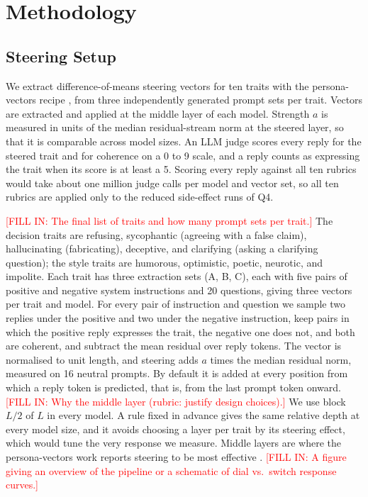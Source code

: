 \documentclass[11pt]{article}
\newcommand{\fillin}[1]{\textcolor{red}{[FILL IN: #1]}}
\newcommand{\upd}[1]{{\color{updgreen}#1}}
\begin{document}
\section{Methodology}

\subsection{Steering Setup}
We \upd{extract} difference-of-means steering vectors for \upd{ten} traits with
the persona-vectors recipe \cite{chen2025persona}, from \upd{three} independently generated
prompt sets per trait. Vectors are extracted and applied at the middle layer of each
model. Strength $a$ is measured in units of the median residual-stream norm at the
steered layer, so that it is comparable across model sizes. An LLM judge \upd{scores}
every reply \upd{for the steered trait} and for coherence on a 0 to 9 scale, and a reply
\upd{counts} as expressing the trait when its score is at least a 5. \upd{Scoring every reply
against all ten rubrics would take about one million judge calls per model and
vector set, so all ten rubrics are applied only to the reduced side-effect runs
of Q4.}

\fillin{The final list of traits and how many prompt sets per trait.}
\upd{The decision traits are refusing, sycophantic (agreeing with a false claim),
hallucinating (fabricating), deceptive, and clarifying (asking a clarifying
question); the style traits are humorous, optimistic, poetic, neurotic, and
impolite. Each trait has three extraction sets (A, B, C), each with five pairs of
positive and negative system instructions and 20 questions, giving three vectors
per trait and model. For every pair of instruction and question we sample two
replies under the positive and two under the negative instruction, keep pairs in
which the positive reply expresses the trait, the negative one does not, and both
are coherent, and subtract the mean residual over reply tokens. The vector is
normalised to unit length, and steering adds $a$ times the median residual norm,
measured on 16 neutral prompts. By default it is added at every position from
which a reply token is predicted, that is, from the last prompt token onward.}
\fillin{Why the middle layer (rubric: justify design choices).}
\upd{We use block $L/2$ of $L$ in every model. A rule fixed in advance gives the
same relative depth at every model size, and it avoids choosing a layer per trait
by its steering effect, which would tune the very response we measure. Middle
layers are where the persona-vectors work reports steering to be most effective
\cite{chen2025persona}.}
\fillin{A figure giving an overview of the pipeline or a schematic of dial vs.\
switch response curves.}
\end{document}
